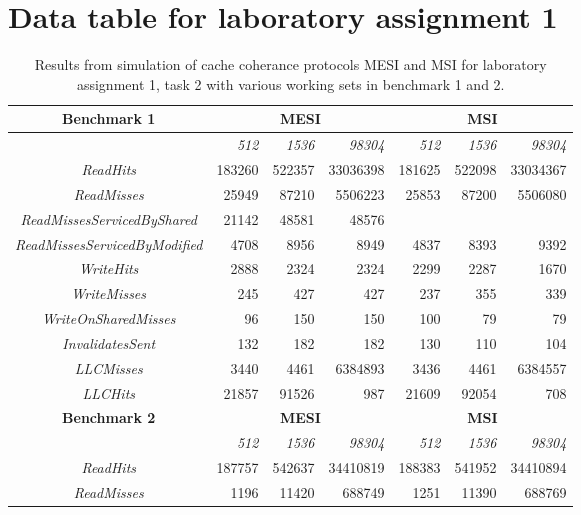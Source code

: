 \section{Data table for laboratory assignment 1}
\begin{table}[h]
	\caption{\label{tbl:lab2}Results from simulation of cache coherance protocols MESI and MSI for laboratory assignment 1, task 2 with various working sets in benchmark 1 and 2.}
    \begin{adjustwidth}{-2cm}{-2cm}  
        \begin{center}

			\begin{tabular}{| c | r r r | r r r|}
				\textbf{Benchmark 1}& \multicolumn{3}{c|}{\textbf{MESI}} & \multicolumn{3}{c|}{\textbf{MSI}} \\
				\hline
				&\textit{512}&\textit{1536}&\textit{98304}&\textit{512}&\textit{1536}&\textit{98304}\\
				\hline
				\textit{ReadHits} & 183260 & 522357 & 33036398 & 181625 & 522098 & 33034367 \\
				\textit{ReadMisses} & 25949 & 87210 & 5506223 & 25853 & 87200 & 5506080\\ 
				\textit{ReadMissesServicedByShared} & 21142 & 48581 & 48576 \\ 
				\textit{ReadMissesServicedByModified} & 4708 & 8956 & 8949 & 4837 & 8393 & 9392\\ 
				\textit{WriteHits} & 2888 & 2324 & 2324 & 2299 & 2287 & 1670 \\ 
				\textit{WriteMisses} & 245 & 427 & 427 & 237 & 355 & 339 \\ 
				\textit{WriteOnSharedMisses} & 96 & 150 & 150 & 100 & 79 & 79 \\ 
				\textit{InvalidatesSent} & 132 & 182 & 182 & 130 & 110 & 104 \\ 
				\textit{LLCMisses} & 3440 & 4461 & 6384893 & 3436 & 4461 & 6384557 \\ 
				\textit{LLCHits} & 21857 & 91526 & 987 & 21609 & 92054 & 708 \\
				\hline
			\textbf{Benchmark 2}& \multicolumn{3}{c|}{\textbf{MESI}} & \multicolumn{3}{c|}{\textbf{MSI}} \\
				\hline
				&\textit{512}&\textit{1536}&\textit{98304}&\textit{512}&\textit{1536}&\textit{98304}\\
				\hline
				\textit{ReadHits} & 187757 & 542637 & 34410819 & 188383 & 541952 & 34410894 \\
				\textit{ReadMisses} & 1196 & 11420 & 688749 & 1251 & 11390 & 688769 \\

\end{tabular}
\end{center}
\end{adjustwidth}
\end{table}
